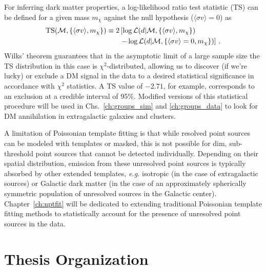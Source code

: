 For inferring dark matter properties, a log-likelihood ratio test statistic (TS) can be defined for a given mass $m_\chi$ against the null hypothesis ($\langle\sigma v\rangle=0$) as
\begin{equation}\begin{aligned}
{\rm TS}(\mathcal{M}, \{ \langle\sigma v\rangle, m_\chi\}) \equiv 2 &\left[ \log \mathcal{L}(d | \mathcal{M}, \{\langle\sigma v\rangle, m_\chi \}) \right.\\
&\left.- \log \mathcal{L}(d | \mathcal{M}, \{{\langle\sigma v\rangle=0}, m_\chi \}) \right]\,.
\label{eq:TSdef_darksky}
\end{aligned}\end{equation}
Wilks' theorem guarantees that in the asymptotic limit of a large sample size the TS distribution in this case is $\chi^2$-distributed, allowing us to discover (if we're lucky) or exclude a DM signal in the data to a desired statistical significance in accordance with $\chi^2$ statistics. A TS value of $-2.71$, for example, corresponds to an exclusion at a credible interval of 95\%. Modified versions of this statistical procedure will be used in Chs.~\ref{ch:groups_sim} and \ref{ch:groups_data} to look for DM annihilation in extragalactic galaxies and clusters.

A limitation of Poissonian template fitting is that while resolved point sources can be modeled with templates or masked, this is not possible for dim, sub-threshold point sources that cannot be detected individually. Depending on their spatial distribution, emission from these unresolved point sources is typically absorbed by other extended templates, \emph{e.g.} isotropic (in the case of extragalactic sources) or Galactic dark matter (in the case of an approximately spherically symmetric population of unresolved sources in the Galactic center). Chapter~\ref{ch:nptfit} will be dedicated to extending traditional Poissonian template fitting methods to statistically account for the presence of unresolved point sources in the data.

\section{Thesis Organization}
\label{sec:summary}

